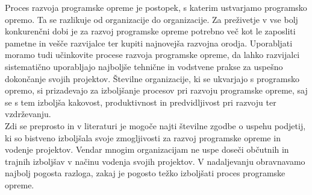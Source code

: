 \documentclass[a4paper,12pt,openright]{book}
\begin{document}
Proces razvoja programske opreme je postopek, s katerim ustvarjamo programsko opremo. Ta se razlikuje od organizacije do organizacije. Za preživetje v vse bolj konkurenčni dobi je za razvoj programske opreme potrebno več kot le zaposliti pametne in vešče razvijalce ter kupiti najnovejša razvojna orodja. Uporabljati moramo tudi učinkovite procese razvoja programske opreme, da lahko razvijalci sistematično uporabljajo najboljše tehnične in vodstvene prakse za uspešno dokončanje svojih projektov. Številne organizacije, ki se ukvarjajo s programsko opremo, si prizadevajo za izboljšanje procesov pri razvoju programske opreme, saj se s tem izboljša kakovost, produktivnost in predvidljivost pri razvoju ter vzdrževanju. \\
Zdi se preprosto in v literaturi je mogoče najti številne zgodbe o uspehu podjetij, ki so bistveno izboljšala svoje zmogljivosti za razvoj programske opreme in vodenje projektov. Vendar mnogim organizacijam ne uspe doseči občutnih in trajnih izboljšav v načinu vodenja svojih projektov. V nadaljevanju obravnavamo najbolj pogosta razloga, zakaj je pogosto težko izboljšati proces programske opreme.
\cite{aggarwal2005software, humphrey1989managing}
\end{document}
